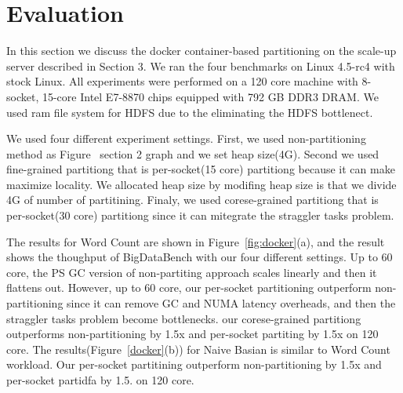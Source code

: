 \section{Evaluation}

\ifkor
In this section we discuss the docker container-based partitioning on the
scale-up server described in Section 3.
We ran the four benchmarks on Linux 4.5-rc4 with stock Linux. 
All experiments were performed on a 120 core machine with 8-socket, 15-core
Intel E7-8870 chips equipped with 792 GB DDR3 DRAM.
We used ram file system for HDFS due to the eliminating the HDFS bottlenect.
\else

\fi




\ifkor
We used four different experiment settings.
First, we used non-partitioning method as Figure~ section 2 graph and we set
heap size(4G).
Second we used fine-grained partitiong that is per-socket(15 core) partitiong
because it can make maximize locality.
We allocated heap size by modifing heap size is that we divide 4G of number of
partitining.
Finaly, we used corese-grained partitiong that is per-socket(30 core) partitiong
since it can mitegrate the straggler tasks problem.
\else

\fi


\ifkor
The results for Word Count are shown in Figure~\ref{fig:docker}(a), and the
result shows the thoughput of BigDataBench with our four different settings.
Up to 60 core, the PS GC version of non-partiting approach scales linearly and
then it flattens out.
However, up to 60 core, our per-socket partitioning outperform non-partitioning
since it can remove GC and NUMA latency overheads, and then the straggler tasks
problem become bottlenecks.
our corese-grained partitiong outperforms non-partitioning by 1.5x and
per-socket partiting by 1.5x on 120 core.
The results(Figure~\ref{docker}(b)) for Naive Basian is similar to Word Count
workload.
Our per-socket partitining outperform non-partitioning by 1.5x and per-socket
partidfa by 1.5. on 120 core.
\else 

